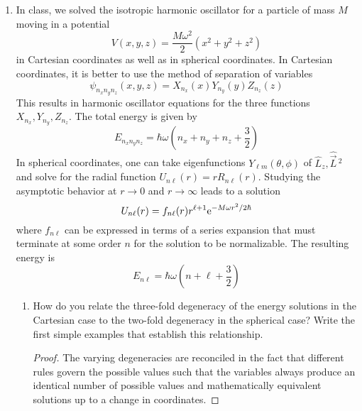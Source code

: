 \documentclass[../psets.tex]{subfiles}
\begin{document}
\begin{enumerate}
\begin{enumerate}
\begin{proof}
        \end{proof}
    \end{enumerate}
    \item In class, we solved the isotropic harmonic oscillator for a particle of mass $M$ moving in a potential
    \begin{equation}
        V(x,y,z) = \frac{M\omega^2}{2}(x^2+y^2+z^2)
    \end{equation}
    in Cartesian coordinates as well as in spherical coordinates. In Cartesian coordinates, it is better to use the method of separation of variables
    \begin{equation}
        \psi_{n_xn_yn_z}(x,y,z) = X_{n_x}(x)Y_{n_y}(y)Z_{n_z}(z)
    \end{equation}
    This results in harmonic oscillator equations for the three functions $X_{n_x},Y_{n_y},Z_{n_z}$. The total energy is given by
    \begin{equation}
        E_{n_xn_yn_z} = \hbar\omega\left( n_x+n_y+n_z+\frac{3}{2} \right)
    \end{equation}
    In spherical coordinates, one can take eigenfunctions $Y_{\ell m}(\theta,\phi)$ of $\hat{L}_z,\hat{\vec{L}}{\,}^2$ and solve for the radial function $U_{n\ell}(r)=rR_{n\ell}(r)$. Studying the asymptotic behavior at $r\to 0$ and $r\to\infty$ leads to a solution
    \begin{equation}
        U_{n\ell}(r) = f_{n\ell}(r)r^{\ell+1}\e[-M\omega r^2/2\hbar]
    \end{equation}
    where $f_{n\ell}$ can be expressed in terms of a series expansion that must terminate at some order $n$ for the solution to be normalizable. The resulting energy is
    \begin{equation}
        E_{n\ell} = \hbar\omega\left( n+\ell+\frac{3}{2} \right)
    \end{equation}
    \begin{enumerate}
        \item How do you relate the three-fold degeneracy of the energy solutions in the Cartesian case to the two-fold degeneracy in the spherical case? Write the first simple examples that establish this relationship.
        \begin{proof}
            The varying degeneracies are reconciled in the fact that different rules govern the possible values such that the variables always produce an identical number of possible values and mathematically equivalent solutions up to a change in coordinates.\par

\end{proof}
\end{enumerate}
\end{enumerate}
\end{document}
